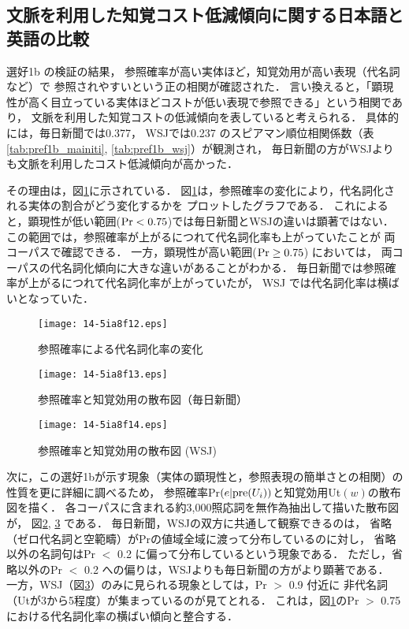 \documentclass[japanese]{jnlp_1.3e}
\begin{document}
\subsection{文脈を利用した知覚コスト低減傾向に関する日本語と英語の比較}
\label{sec:pron_ratio}
選好1b の検証の結果，
参照確率が高い実体ほど，知覚効用が高い表現（代名詞など）で
参照されやすいという正の相関が確認された．
言い換えると，「顕現性が高く目立っている実体ほどコストが低い表現で参照できる」という相関であり，
文脈を利用した知覚コストの低減傾向を表していると考えられる．
具体的には，毎日新聞では0.377，
WSJでは0.237 のスピアマン順位相関係数（表\ref{tab:pref1b_mainiti}, \ref{tab:pref1b_wsj}）が観測され，
毎日新聞の方がWSJよりも文脈を利用したコスト低減傾向が高かった．


その理由は，図\ref{fig:pron_ratio}に示されている．
図\ref{fig:pron_ratio}は，参照確率の変化により，代名詞化される実体の割合がどう変化するかを
プロットしたグラフである．
これによると，顕現性が低い範囲(${\rm Pr}<0.75$)では毎日新聞とWSJの違いは顕著ではない．
この範囲では，参照確率が上がるにつれて代名詞化率も上がっていたことが
両コーパスで確認できる．
一方，顕現性が高い範囲(${\rm Pr}\ge 0.75$) においては，
両コーパスの代名詞化傾向に大きな違いがあることがわかる．
毎日新聞では参照確率が上がるにつれて代名詞化率が上がっていたが，
WSJ では代名詞化率は横ばいとなっていた．



\begin{figure}[t]
 \begin{center}
      \texttt{[image: 14-5ia8f12.eps]}
  \caption{参照確率による代名詞化率の変化}
  \label{fig:pron_ratio}
 \end{center}
\end{figure}
\begin{figure}[t]
\begin{center}
      \texttt{[image: 14-5ia8f13.eps]}
  \caption{参照確率と知覚効用の散布図（毎日新聞）}
  \label{fig:salutil_scatter_mainiti}
\end{center}
\end{figure}
\begin{figure}[t]
\begin{center}
      \texttt{[image: 14-5ia8f14.eps]}
  \caption{参照確率と知覚効用の散布図 (WSJ)}
  \label{fig:salutil_scatter_wsj}
 \end{center}
\end{figure}


次に，この選好1bが示す現象（実体の顕現性と，参照表現の簡単さとの相関）の性質を更に詳細に調べるため，
参照確率{\rm Pr$(e|{\rm pre}(U_i))$}と知覚効用{\rm Ut$(w)$}の散布図を描く．
各コーパスに含まれる約3,000照応詞を無作為抽出して描いた散布図が，
図\ref{fig:salutil_scatter_mainiti}, \ref{fig:salutil_scatter_wsj} である．
毎日新聞，WSJの双方に共通して観察できるのは，
省略（ゼロ代名詞と空範疇）がPrの値域全域に渡って分布しているのに対し，
省略以外の名詞句はPr $<$ 0.2 に偏って分布しているという現象である．
ただし，省略以外のPr $<$ 0.2 への偏りは，WSJよりも毎日新聞の方がより顕著である．
一方，WSJ（図\ref{fig:salutil_scatter_wsj}）のみに見られる現象としては，Pr $>$ 0.9 付近に
非代名詞（Utが3から5程度）が集まっているのが見てとれる．
これは，図\ref{fig:pron_ratio}のPr $>$ 0.75における代名詞化率の横ばい傾向と整合する．
\end{document}
